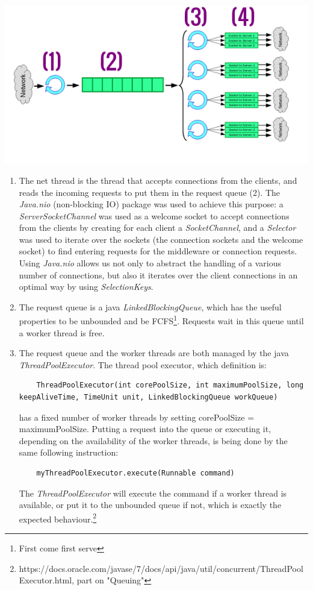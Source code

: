 \documentclass[11pt,a4paper]{article}
\begin{document}
\begin{center}
\includegraphics[scale=0.69]{baseIm.png}
\end{center}
\begin{enumerate}[ {(}1{)} ]
\item The net thread is the thread that accepts connections from the clients, and reads the incoming requests to put them in the request queue (2). The \textit{Java.nio} (non-blocking IO) package was used to achieve this purpose: a \textit{ServerSocketChannel} was used as a welcome socket to accept connections from the clients by creating for each client a \textit{SocketChannel}, and a \textit{Selector} was used to iterate over the sockets (the connection sockets and the welcome socket) to find entering requests for the middleware or connection requests. Using \textit{Java.nio} allows us not only to abstract the handling of a various number of connections, but also it iterates over the client connections in an optimal way by using \textit{SelectionKeys}. 
\item The request queue is a java \textit{LinkedBlockingQueue}, which has the useful properties to be unbounded and be FCFS\footnote{First come first serve}. Requests wait in this queue until a worker thread is free.   

\item The request queue and the worker threads are both managed by the java \textit{ThreadPoolExecutor}. The thread pool executor, which definition is: 
\begin{lstlisting}
	ThreadPoolExecutor(int corePoolSize, int maximumPoolSize, long keepAliveTime, TimeUnit unit, LinkedBlockingQueue workQueue)
\end{lstlisting} 
has a fixed number of worker threads by setting corePoolSize = maximumPoolSize. Putting a request into the queue or executing it, depending on the availability of the worker threads, is being done by the same following instruction:
\begin{lstlisting}
	myThreadPoolExecutor.execute(Runnable command)
\end{lstlisting}
The \textit{ThreadPoolExecutor} will execute the command if a worker thread is available, or put it to the unbounded queue if not, which is exactly the expected behaviour.\footnote{https://docs.oracle.com/javase/7/docs/api/java/util/concurrent/ThreadPoolExecutor.html, part on "Queuing"}     
 

\end{enumerate}
\end{document}
